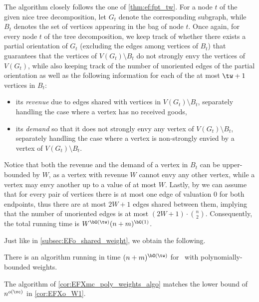 \documentclass[11pt,letterpaper]{article}
\begin{document}
\begin{proofsketch}
    The algorithm closely follows the one of \cref{thm:ef:fpt_tw}.
    For a node $t$ of the given nice tree decomposition, let $G_t$ denote the corresponding subgraph,
    while $B_t$ denotes the set of vertices appearing in the bag of node $t$.
    Once again, for every node $t$ of the tree decomposition, we keep track of whether there exists a partial orientation of $G_t$
    (excluding the edges among vertices of $B_t$)
    that guarantees that the vertices of $V(G_t) \setminus B_t$ do not strongly envy the vertices of $V(G_t)$,
    while also keeping track of the number of unoriented edges of the partial orientation
    as well as the following information for each of the at most $\tw+1$ vertices in $B_t$:
    \begin{itemize}
        \item its \emph{revenue} due to edges shared with vertices in $V(G_t) \setminus B_t$,
        separately handling the case where a vertex has no received goods,

        \item its \emph{demand} so that it does not strongly envy any vertex of $V(G_t) \setminus B_t$,
        separately handling the case where a vertex is non-strongly envied by a vertex of $V(G_t) \setminus B_t$.
    \end{itemize}
    Notice that both the revenue and the demand of a vertex in $B_t$ can be upper-bounded by $W$,
    as a vertex with revenue $W$ cannot envy any other vertex, while a vertex may envy another up to a value of at most $W$.
    Lastly, by  we can assume that for every pair of vertices there is at most one edge of valuation $0$
    for both endpoints,
    thus there are at most $2W + 1$ edges shared between them, implying that
    the number of unoriented edges is at most $(2W+1) \cdot \binom{n}{2}$.
    Consequently, the total running time is $W^{\bO(\tw)} (n+m)^{\bO(1)}$.
\end{proofsketch}

Just like in \cref{subsec:EFo_shared_weight}, we obtain the following.

\begin{corollary}\label{cor:EFXmc_poly_weights_algo}
    There is an algorithm running in time $(n+m)^{\bO(\tw)}$ for \EFXmc\ with polynomially-bounded weights.
\end{corollary}

\begin{remark}
    The algorithm of \cref{cor:EFXmc_poly_weights_algo} matches the lower bound of $n^{o(\vc)}$ in \cref{cor:EFXo_W1}.
\end{remark}
\end{document}
